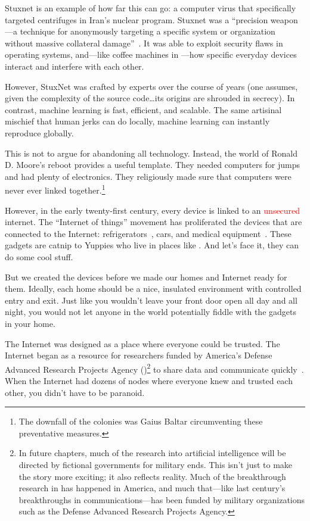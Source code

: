Stuxnet is an example of how far this can go: a computer virus that
specifically targeted centrifuges in Iran's nuclear program.
%
Stuxnet was a ``precision weapon---a technique for anonymously
targeting a specific system or organization without massive collateral
damage''~\citep{lachow-11}.
%
It was able to exploit security flaws in operating systems, and---like
coffee machines in \crunchyCity{}---how specific everyday devices
interact and interfere with each other.

However, StuxNet was crafted by experts over the course of years (one
assumes, given the complexity of the source code\dots its origins are
shrouded in secrecy).
%
In contrast, machine learning is fast, efficient, and scalable.
%
The same artisinal
mischief that human jerks can do locally, machine learning can
instantly reproduce globally.  

This is not to argue for abandoning all technology.
%
Instead, the world of Ronald D. Moore's 
reboot provides a useful template.
%
They needed computers for jumps and had plenty of electronics.
%
They religiously made sure that computers were never ever linked
together.\footnote{The downfall of the colonies was Gaius Baltar
  circumventing these preventative measures.}


However, in the early twenty-first century, every device is linked to
an \textcolor{red}{unsecured} internet.
%
The ``Internet of things'' movement has proliferated the devices that
are connected to the Internet: refrigerators~\citep{tanczer-18}, cars,
and medical equipment~\citep{yaqoob-19}.
%
These gadgets are catnip to Yuppies who live in places like
\crunchyCity{}.  And let's face it, they can do some cool stuff.

But we created the devices before we made our homes and Internet ready
for them.
%
Ideally, each home should be a nice, insulated environment
with controlled entry and exit.
%
Just like you wouldn't leave your
front door open all day and all night, you would not let anyone in the
world potentially fiddle with the gadgets in your home.  

The Internet was designed as a place where everyone could be trusted.
The Internet began as a resource for researchers funded by
America's Defense Advanced Research Projects Agency ()\footnote{In future chapters, much of the
  research into artificial intelligence will be directed by fictional
  governments for military ends.  This isn't just to make the story
  more exciting; it also reflects reality.  Much of the breakthrough
  research in  has happened in America, and much that---like
  last century's breakthroughs in communications---has been funded by
  military organizations such as the Defense Advanced Research
  Projects Agency.} to share data and communicate
quickly~\citep{leiner-09}.
%
When the Internet had dozens of nodes where everyone knew and trusted
each other, you didn't have to be paranoid.

